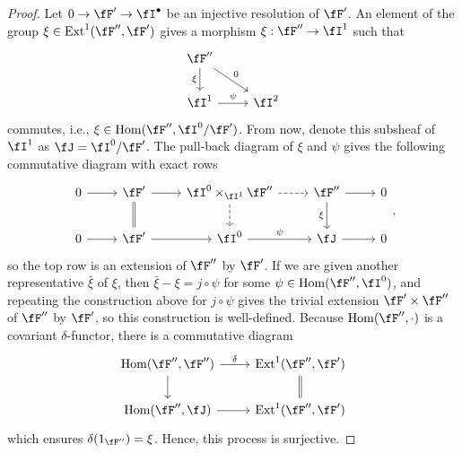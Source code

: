 \documentclass[a4paper]{article}
\begin{document}
\begin{enumerate} [label=\textbf{\arabic*.}, leftmargin=0em]
        \begin{proof}
          Let $0 \to \fF' \to \fI^\bullet$ be an injective resolution of $\fF'$.
          An element of the group $\xi \in \Ext^1(\fF'', \fF')$ gives a morphism $\xi : \fF'' \to \fI^1$ such that
          \[ \begin{tikzcd}
              \fF'' \arrow[d, "\xi"'] \arrow[rd, "0"] &       \\
              \fI^1 \arrow[r, "\psi"]                                 & \fI^2
            \end{tikzcd} \]
          commutes, i.e., $\xi \in \Hom(\fF'', \fI^0 / \fF')$.
          From now, denote this subsheaf of $\fI^1$ as $\fJ = \fI^0 / \fF'$.
          The pull-back diagram of $\xi$ and $\psi$ gives the following commutative diagram with exact rows
          \[ \begin{tikzcd}
              0 \arrow[r] & \fF' \arrow[r] \arrow[d, Rightarrow, no head] & \fI^0 \times_{\fI^1} \fF'' \arrow[r, dashed] \arrow[d, dashed] & \fF'' \arrow[d, "\xi"'] \arrow[r] & 0        \\
              0 \arrow[r] & \fF' \arrow[r]                           & \fI^0 \arrow[r, "\psi"]                                           & \fJ \arrow[r]                           & 0
            \end{tikzcd}, \]
          so the top row is an extension of $\fF''$ by $\fF'$.
          If we are given another representative $\bar{\xi}$ of $\xi$, then $\bar{\xi} - \xi = j \circ \psi$ for some $\psi \in \Hom(\fF'', \fI^0)$, and repeating the construction above for $j \circ \psi$ gives the trivial extension $\fF' \times \fF''$ of $\fF''$ by $\fF'$, so this construction is well-defined.
          Because $\Hom(\fF'', \cdot)$ is a covariant $\delta$-functor, there is a commutative diagram
          \[ \begin{tikzcd}
              {\Hom(\fF'', \fF'')} \arrow[d] \arrow[r, "\delta"] & {\Ext^1(\fF'', \fF')} \arrow[d, Rightarrow, no head] \\
              {\Hom(\fF'', \fJ)} \arrow[r]      & {\Ext^1(\fF'', \fF')}
            \end{tikzcd} \]
          which ensures $\delta(1_{\fF''}) = \xi$.
          Hence, this process is surjective.


\end{proof}
\end{enumerate}
\end{document}
